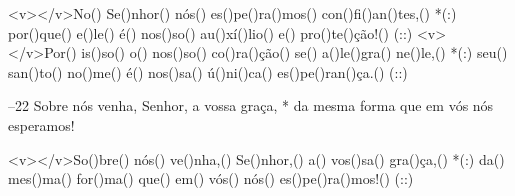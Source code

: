 <v></v>No() Se()nhor() nós() es()pe()ra()mos() con()fi()an()tes,() *(:)
por()que() e()le() é() nos()so() au()xí()lio() e() pro()te()ção!() (::)
<v></v>Por() is()so() o() nos()so() co()ra()ção() se() a()le()gra() ne()le,() *(:)
seu() san()to() no()me() é() nos()sa() ú()ni()ca() es()pe()ran()ça.() (::)

–22 Sobre nós venha, Senhor, a vossa graça, *
da mesma forma que em vós nós esperamos!

<v></v>So()bre() nós() ve()nha,() Se()nhor,() a() vos()sa() gra()ça,() *(:)
da() mes()ma() for()ma() que() em() vós() nós() es()pe()ra()mos!() (::)